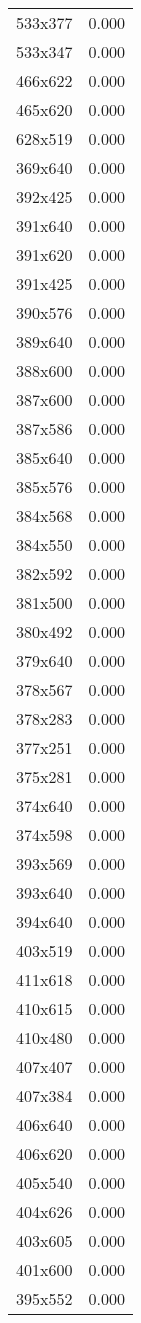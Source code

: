 \begin{table}
\begin{tabular}{lr}
533x377 & 0.000 \\
533x347 & 0.000 \\
466x622 & 0.000 \\
465x620 & 0.000 \\
628x519 & 0.000 \\
369x640 & 0.000 \\
392x425 & 0.000 \\
391x640 & 0.000 \\
391x620 & 0.000 \\
391x425 & 0.000 \\
390x576 & 0.000 \\
389x640 & 0.000 \\
388x600 & 0.000 \\
387x600 & 0.000 \\
387x586 & 0.000 \\
385x640 & 0.000 \\
385x576 & 0.000 \\
384x568 & 0.000 \\
384x550 & 0.000 \\
382x592 & 0.000 \\
381x500 & 0.000 \\
380x492 & 0.000 \\
379x640 & 0.000 \\
378x567 & 0.000 \\
378x283 & 0.000 \\
377x251 & 0.000 \\
375x281 & 0.000 \\
374x640 & 0.000 \\
374x598 & 0.000 \\
393x569 & 0.000 \\
393x640 & 0.000 \\
394x640 & 0.000 \\
403x519 & 0.000 \\
411x618 & 0.000 \\
410x615 & 0.000 \\
410x480 & 0.000 \\
407x407 & 0.000 \\
407x384 & 0.000 \\
406x640 & 0.000 \\
406x620 & 0.000 \\
405x540 & 0.000 \\
404x626 & 0.000 \\
403x605 & 0.000 \\
401x600 & 0.000 \\
395x552 & 0.000 \\

\end{tabular}
\end{table}
